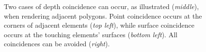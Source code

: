 \documentclass[journal]{vgtc}                %
\begin{document}
\begin{figure}[b]
\begin{minipage}{4cm}
     \end{minipage}
     \begin{minipage}{2.75cm} 
     \end{minipage}    
  \caption{Two cases of depth coincidence can occur, as illustrated ({\it middle}), when rendering adjacent polygons. Point coincidence occurs at the corners of adjacent elements ({\it top left}), while surface coincidence occurs at the touching elements' surfaces ({\it bottom left}). All coincidences can be avoided ({\it right}).}  
  \label{fig:depthcoincidence}
\end{figure}
\end{document}
